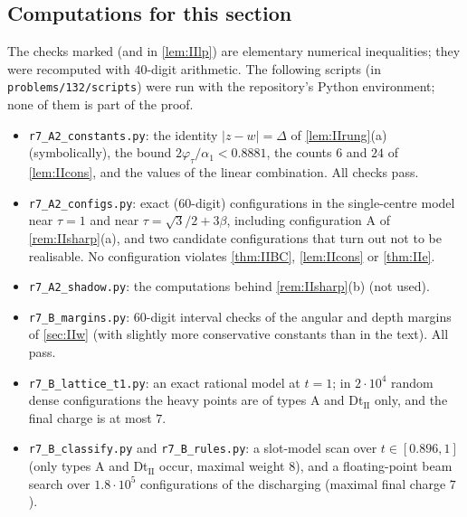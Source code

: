 \subsection{Computations for this section}\label{sec:IIchecks}
The checks marked  (and  in \cref{lem:IIlp}) are elementary numerical inequalities; they were recomputed with $40$-digit arithmetic. The following scripts (in \texttt{problems/132/scripts}) were run with the repository's Python environment; none of them is part of the proof.
\begin{itemize}[leftmargin=2em]
\item \texttt{r7\_A2\_constants.py}: the identity $|z-w|=\Delta$ of \cref{lem:IIrung}(a) (symbolically), the bound $2\varphi_\tau/\alpha_1<0.8881$, the counts $6$ and $24$ of \cref{lem:IIcons}, and the values of the linear combination. All checks pass.
\item \texttt{r7\_A2\_configs.py}: exact ($60$-digit) configurations in the single-centre model near $\tau=1$ and near $\tau=\sqrt3/2+3\beta$, including configuration A of \cref{rem:IIsharp}(a), and two candidate configurations that turn out not to be realisable. No configuration violates \cref{thm:IIBC}, \cref{lem:IIcons} or \cref{thm:IIe}.
\item \texttt{r7\_A2\_shadow.py}: the computations behind \cref{rem:IIsharp}(b) (not used).
\item \texttt{r7\_B\_margins.py}: $60$-digit interval checks of the angular and depth margins of \cref{sec:IIw} (with slightly more conservative constants than in the text). All pass.
\item \texttt{r7\_B\_lattice\_t1.py}: an exact rational model at $t=1$; in $2\cdot10^4$ random dense configurations the heavy points are of types A and Dt$_{\mathrm{II}}$ only, and the final charge is at most $7$.
\item \texttt{r7\_B\_classify.py} and \texttt{r7\_B\_rules.py}: a slot-model scan over $t\in[0.896,1]$ (only types A and Dt$_{\mathrm{II}}$ occur, maximal weight $8$), and a floating-point beam search over $1.8\cdot10^5$ configurations of the discharging (maximal final charge $7$).
\end{itemize}
